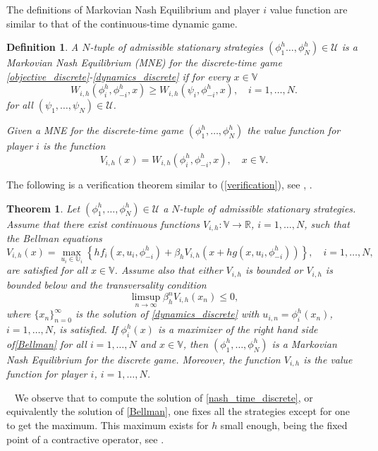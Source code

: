 \documentclass[12pt]{article}
\newtheorem{theorem}{Theorem}
\newtheorem{definition}{Definition}
\newcounter{remark}
\def\theremark {\arabic{remark}}
\newenvironment{remark}{\refstepcounter{remark}\par\noindent{\bf Remark\ \theremark}\ }{\par}
\begin{document}
The definitions of Markovian Nash Equilibrium and player $i$ value function are similar to that of the continuous-time dynamic game.

\begin{definition}\label{value_function_definition_time_discrete}
A $N$-tuple of admissible stationary strategies $(\phi_1^h\dots,\phi_N^h)\in\mathcal{U}$ is a Markovian Nash Equilibrium (MNE) for the discrete-time game \eqref{objective_discrete}-\eqref{dynamics_discrete} if for every $x\in\mathbb{V}$
\begin{equation}\label{nash_time_discrete}
W_{i,h}(\phi_i^h,\phi_{-i}^h,x)\ge W_{i,h}(\psi_i,\phi_{-i}^h,x),\quad i=1,\dots,N.
\end{equation}
for all $(\psi_1,\dots,\psi_N)\in\mathcal{U}$.

Given a MNE for the discrete-time game $(\phi_1^h,\dots,\phi_N^h)$ the value function for player $i$ is the function
$$V_{i,h}(x)=W_{i,h}(\phi_i^h,\phi_{-i}^h,x),\quad x\in\mathbb{V}.$$
\end{definition}
The following is a verification theorem similar to (\ref{verification}), see \cite{Krawczyk_Petkrov}, \cite{Haurie_et_al}.

\begin{theorem}\label{verification_time_discrete}
Let $(\phi_1^h,\dots,\phi_N^h)\in\mathcal{U}$ a $N$-tuple of admissible stationary strategies. Assume that there exist continuous functions $V_{i,h}:\mathbb{V}\rightarrow\mathbb{R}$, $i=1,\dots,N$, such that the Bellman equations
\begin{equation}\label{Bellman}
 V_{i,h}(x)=\max_{u_i\in\mathbb{U}_i}\left\{hf_i(x,u_i,\phi_{-i}^h)+\beta_h V_{i,h}(x+hg(x,u_i,\phi_{-i}^h))\right\}, \quad i=1,\dots,N,
\end{equation}
are satisfied for all  $x\in\mathbb{V}$.
Assume also that either $V_{i,h}$ is bounded or $V_{i,h}$ is bounded below and the transversality condition
\begin{equation}\label{discrete_time_transversality}
\limsup_{n\rightarrow\infty}\beta_h^nV_{i,h}(x_n) \le 0,
\end{equation}
where $\{x_n\}_{n=0}^\infty$ is the solution of  \eqref{dynamics_discrete} with $u_{i,n}=\phi_i^h(x_n)$, $i=1,\dots, N$, is satisfied.
If $\phi_i^h(x)$ is a maximizer of the right hand side of\eqref{Bellman} for all $i=1,\dots,N$ and $x\in\mathbb{V}$, then $(\phi_1^h,\dots,\phi_N^h)$ is a Markovian Nash Equilibrium for the discrete game. Moreover, the function $V_{i,h}$ is the value function for player $i$, $i=1,\dots, N$.
\end{theorem}{
\begin{remark}\label{remark2}
We observe that to compute the solution of \eqref{nash_time_discrete}, or equivalently the solution of \eqref{Bellman}, one fixes all the strategies except for one to get the maximum.
This maximum exists for $h$ small enough, being the fixed point of a contractive operator, see \cite{Capuzzo_paper}.
\end{remark}}
\end{document}
